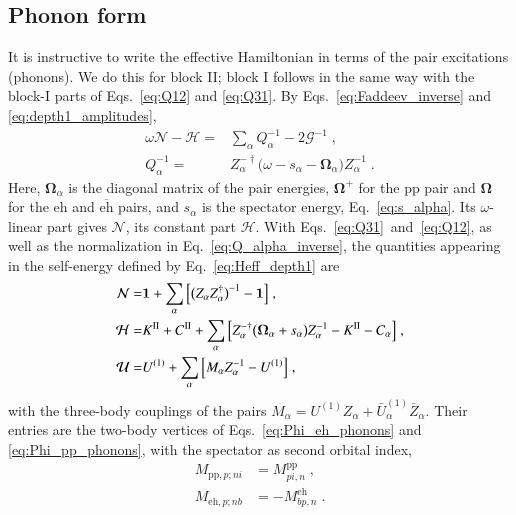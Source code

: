 \documentclass[aip,jcp,reprint,noshowkeys,superscriptaddress]{revtex4-1}
\newcommand{\bI}{\boldsymbol{1}}
\newcommand{\eh}{\text{eh}}
\newcommand{\teh}{\overline{\text{eh}}}
\newcommand{\pp}{\text{pp}}
\begin{document}
\subsection{Phonon form}
\label{sec:phonon_form}
It is instructive to write the effective 
Hamiltonian in terms of the pair excitations (phonons). 
We do this for block II; block I follows in the same way with the block-I parts of Eqs.~\eqref{eq:Q12} and \eqref{eq:Q31}. By Eqs.~\eqref{eq:Faddeev_inverse} and \eqref{eq:depth1_amplitudes},
\begin{equation}
\begin{aligned}
\omega\mathcal N-\mathcal H
={}&
\sum_\alpha Q_\alpha^{-1}-2\mathcal G^{-1} \;,
\\
Q_\alpha^{-1}
={}&
Z_\alpha^{-\dagger}\big(\omega-s_\alpha-\boldsymbol\Omega_\alpha\big)Z_\alpha^{-1} \;.
\end{aligned}
\label{eq:Rinv_phonons}
\end{equation}
Here, $\boldsymbol\Omega_\alpha$ is the diagonal matrix of the pair
energies, $\boldsymbol\Omega^+$ for the $\pp$ pair and $\boldsymbol\Omega$
for the $\eh$ and $\teh$ pairs, and $s_\alpha$ is the spectator energy, Eq.~\eqref{eq:s_alpha}.
Its $\omega$-linear part gives $\mathcal N$, its constant part $\mathcal H$.
With Eqs.~\eqref{eq:Q31}~and~\eqref{eq:Q12},
as well as the normalization in
Eq.~\eqref{eq:Q_alpha_inverse}, the quantities 
appearing in the self-energy defined by
Eq.~\eqref{eq:Heff_depth1}
are
\begin{equation}
	\label{eq:HNU_phonons}
	\begin{aligned}
\mathcal N
= &
\bI+\sum_\alpha\Big
[\big(Z_\alpha Z_\alpha^\dagger\big)^{-1}
-\bI\Big] \;, \\
\mathcal H
= &
K^{\rm II}+C^{\rm II}
+\sum_\alpha\Big[Z_\alpha^{-\dagger}\big(\boldsymbol\Omega_\alpha+s_\alpha\big)Z_\alpha^{-1}
-K^{\rm II}-C_\alpha\Big] \;, \\
\mathcal U
= &
U^{(1)}+\sum_\alpha\Big[M_\alpha Z_\alpha^{-1}-U^{(1)}\Big] \;,
\end{aligned}
\end{equation}
with the three-body couplings of the pairs
$M_\alpha=U^{(1)}Z_\alpha+\bar U^{(1)}_{\alpha}\bar Z_\alpha$. Their entries are the
two-body vertices of Eqs.~\eqref{eq:Phi_eh_phonons} and
\eqref{eq:Phi_pp_phonons}, with the spectator as second orbital index,
\begin{equation}
\begin{aligned}
M_{\pp,p;ni}
&=
M^{\pp}_{pi,n} \;,
\\
M_{\eh,p;nb}
&=
-M^{\eh}_{bp,n} \;.
\end{aligned}
\nonumber
\end{equation}
\end{document}
